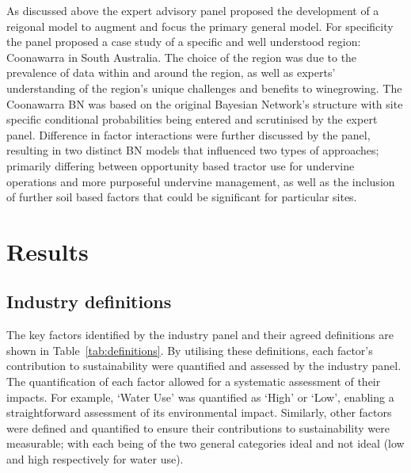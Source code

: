 \documentclass[fleqn,10pt]{wlscirep}
\begin{document}
As discussed above the expert advisory panel proposed the development of a reigonal model to augment and focus the primary general model. For specificity the panel proposed a case study of a specific and well understood region: Coonawarra in South Australia. The choice of the region was due to the prevalence of data within and around the region, as well as experts' understanding of the region's unique challenges and benefits to winegrowing. The Coonawarra BN was based on the original Bayesian Network's structure with site specific conditional probabilities being entered and scrutinised by the expert panel. Difference in factor interactions were further discussed by the panel, resulting in two distinct BN models that influenced two types of approaches; primarily differing between opportunity based tractor use for undervine operations and more purposeful undervine management, as well as the inclusion of further soil based factors that could be significant for particular sites.

\section*{Results}

\subsection*{Industry definitions}

The key factors identified by the industry panel and their agreed definitions are shown in Table~\ref{tab:definitions}. By utilising these definitions, each factor's contribution to sustainability were quantified and assessed by the industry panel. The quantification of each factor allowed for a systematic assessment of their impacts. For example, `Water Use' was quantified as `High' or `Low', enabling a straightforward assessment of its environmental impact. Similarly, other factors were defined and quantified to ensure their contributions to sustainability were measurable; with each being of the two general categories ideal and not ideal (low and high respectively for water use).

% 
% 
\end{document}

